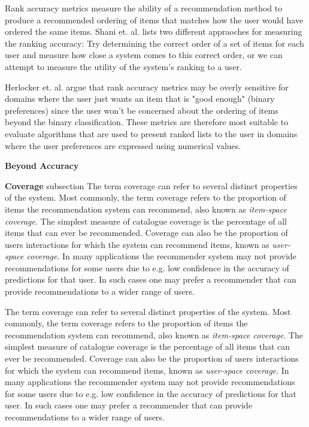 Rank accuracy metrics measure the ability of a recommendation method to produce a recommended ordering of items that matches how the user would have ordered the same items. Shani et. al. \cite{Shani2011} lists two different appraoches for measuring the ranking accuracy: Try determining the correct order of a set of items for each user and measure how close a system comes to this correct order, or we can attempt to measure the utility of the system's ranking to a user.

Herlocker et. al. \cite{Herlocker2004} argue that rank accuracy metrics may be overly sensitive for domains where the user just wants an item that is "good enough" (binary preferences) since the user won't be concerned about the ordering of items beyond the binary classification. These metrics are therefore most suitable to evaluate algorithms that are used to present ranked lists to the user in domains where the user preferences are expressed using numerical values.

\textbf{Beyond Accuracy}

\textbf{Coverage}
subsection
The term coverage can refer to several distinct properties of the system. Most commonly, the term coverage refers to the proportion of items the recommendation system can recommend, also known as \emph{item-space coverage}. The simplest measure of catalogue coverage is the percentage of all items that can ever be recommended. Coverage can also be the proportion of users interactions for which the system can recommend items, known as \emph{user-space coverage}. In many applications the recommender system may not provide recommendations for some users due to e.g. low confidence in the accuracy of predictions for that user. In such cases one may prefer a recommender that can provide recommendations to a wider range of users.

The term coverage can refer to several distinct properties of the system. Most commonly, the term coverage refers to the proportion of items the recommendation system can recommend, also known as \emph{item-space coverage}. The simplest measure of catalogue coverage is the percentage of all items that can ever be recommended. Coverage can also be the proportion of users interactions for which the system can recommend items, known as \emph{user-space coverage}. In many applications the recommender system may not provide recommendations for some users due to e.g. low confidence in the accuracy of predictions for that user. In such cases one may prefer a recommender that can provide recommendations to a wider range of users.

